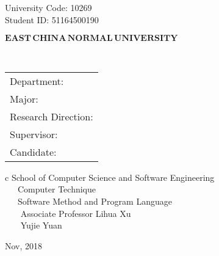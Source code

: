 

\pagestyle{empty}

\hskip 1.83cm {\large University Code: 10269}\\
\hspace*{\fill} {\large Student ID: 51164500190 }

\vskip 2cm

\begin{center}
{\Huge $\mathbf{EAST}\,\mathbf{CHINA}\,\mathbf{NORMAL}\,
\mathbf{UNIVERSITY}$}
\end{center}

\vskip 3cm

\begin{center}
\bfseries{\scshape{\huge \TheisNameEn
}}\\
\end{center}

\vskip 2cm {\large
\begin{center}
\begin{tabular}{l}
Department:\\
Major:\\ 
Research Direction:\\
Supervisor:\\
Candidate:
\end{tabular}
\begin{tabular}c
\normalsize{School of Computer Science and Software Engineering}\\
\hline ~~~Computer Technique    \\
\hline ~~~Software Method and Program Language\\
\hline ~~~ Associate Professor Lihua Xu\\
\hline ~~~  Yujie  Yuan\\
\hline
\end{tabular}
\end{center}}

\vskip 30mm

\begin{center}
{\Large Nov, 2018}
\end{center}
